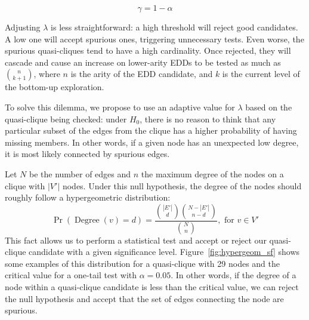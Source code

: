 \begin{equation*}
    \gamma = 1 - \alpha   
\end{equation*}

Adjusting $\lambda$ is less straightforward: a high threshold
will reject good candidates. A low one will accept spurious ones, triggering
unnecessary tests. Even worse, the spurious quasi-cliques tend to have a high cardinality.
Once rejected, they will cascade and cause an increase on lower-arity EDDs
to be tested as much as $\binom{n}{k+1}$, where $n$ is the arity of the EDD candidate,
and $k$ is the current level of the bottom-up exploration.

To solve this dilemma, we propose to use an adaptive value for $\lambda$ based on the
quasi-clique being checked: under $H_0$, there is no reason to think that any
particular subset of the edges from the clique has a higher probability of
having missing members. In other words, if a given node has an
unexpected low degree, it is most likely connected by spurious edges.

Let $N$ be the number of edges and $n$ the
maximum degree of the nodes on a clique with $|V'|$ nodes. Under this null hypothesis,
the degree of the nodes should roughly follow a hypergeometric distribution:
\begin{equation}
    \Pr(\operatorname{Degree}(v) = d)  = \frac{\binom{|E'|}{d} \binom{N - |E'|}{n - d}}{\binom{N}{n}}, \textrm{ for } v \in V'
    \label{eq:hypergeometric}
\end{equation}
This fact allows us to perform a statistical test and accept or reject our
quasi-clique candidate with a given significance level.
Figure~\ref{fig:hypergeom_sf} shows some examples of this distribution for a
quasi-clique with 29 nodes and the critical value for
a one-tail test with $\alpha = 0.05$. In other words, if the degree of a
node within a quasi-clique candidate is less than the critical value, we can reject the
null hypothesis and accept that the set of edges connecting the node are spurious.

